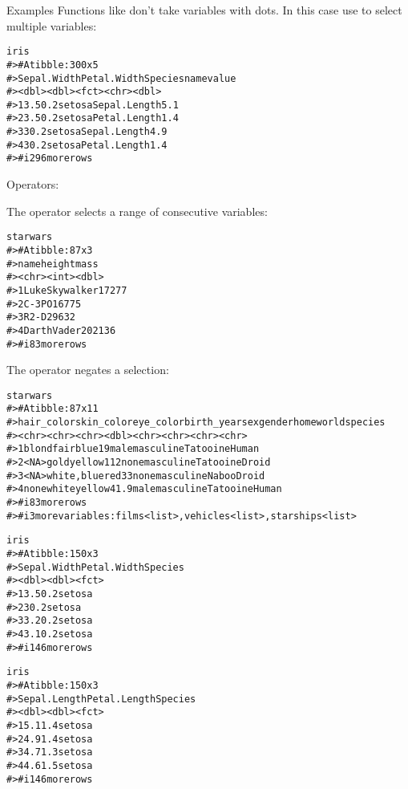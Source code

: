 \documentclass[a4paper]{book}
\begin{document}
\begin{Section}{Examples}
Functions like  don't take variables with
dots. In this case use  to select multiple variables:

\begin{alltt}iris %>% pivot_longer(c(Sepal.Length, Petal.Length))
#> # A tibble: 300 x 5
#>   Sepal.Width Petal.Width Species name         value
#>         <dbl>       <dbl> <fct>   <chr>        <dbl>
#> 1         3.5         0.2 setosa  Sepal.Length   5.1
#> 2         3.5         0.2 setosa  Petal.Length   1.4
#> 3         3           0.2 setosa  Sepal.Length   4.9
#> 4         3           0.2 setosa  Petal.Length   1.4
#> # i 296 more rows
\end{alltt}

%
\begin{SubSection}{Operators:}

The \code{:} operator selects a range of consecutive variables:

\begin{alltt}starwars %>% select(name:mass)
#> # A tibble: 87 x 3
#>   name           height  mass
#>   <chr>           <int> <dbl>
#> 1 Luke Skywalker    172    77
#> 2 C-3PO             167    75
#> 3 R2-D2              96    32
#> 4 Darth Vader       202   136
#> # i 83 more rows
\end{alltt}


The \code{!} operator negates a selection:

\begin{alltt}starwars %>% select(!(name:mass))
#> # A tibble: 87 x 11
#>   hair_color skin_color  eye_color birth_year sex   gender    homeworld species
#>   <chr>      <chr>       <chr>          <dbl> <chr> <chr>     <chr>     <chr>  
#> 1 blond      fair        blue            19   male  masculine Tatooine  Human  
#> 2 <NA>       gold        yellow         112   none  masculine Tatooine  Droid  
#> 3 <NA>       white, blue red             33   none  masculine Naboo     Droid  
#> 4 none       white       yellow          41.9 male  masculine Tatooine  Human  
#> # i 83 more rows
#> # i 3 more variables: films <list>, vehicles <list>, starships <list>

iris %>% select(!c(Sepal.Length, Petal.Length))
#> # A tibble: 150 x 3
#>   Sepal.Width Petal.Width Species
#>         <dbl>       <dbl> <fct>  
#> 1         3.5         0.2 setosa 
#> 2         3           0.2 setosa 
#> 3         3.2         0.2 setosa 
#> 4         3.1         0.2 setosa 
#> # i 146 more rows

iris %>% select(!ends_with("Width"))
#> # A tibble: 150 x 3
#>   Sepal.Length Petal.Length Species
#>          <dbl>        <dbl> <fct>  
#> 1          5.1          1.4 setosa 
#> 2          4.9          1.4 setosa 
#> 3          4.7          1.3 setosa 
#> 4          4.6          1.5 setosa 
#> # i 146 more rows
\end{alltt}



\end{SubSection}
\end{Section}
\end{document}
